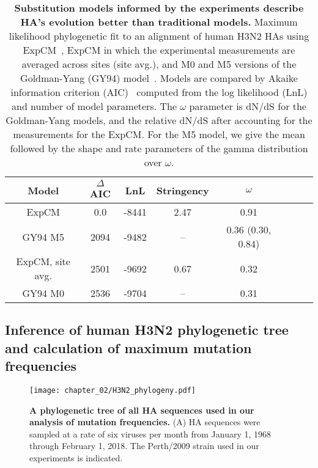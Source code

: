 \begin{table}
\caption{\label{tab:phydms}
  {\bf Substitution models informed by the experiments describe HA's evolution better than traditional models.}
  Maximum likelihood phylogenetic fit to an alignment of human H3N2 HAs using ExpCM~\citep{hilton2017phydms}, ExpCM in which the experimental measurements are averaged across sites (site avg.), and M0 and M5 versions of the Goldman-Yang (GY94) model~\citep{yang2000codon}.
  Models are compared by Akaike information criterion (AIC)~\citep{posada2004model} computed from the log likelihood (LnL) and number of model parameters.
  The $\omega$ parameter is dN/dS for the Goldman-Yang models, and the relative dN/dS after accounting for the measurements for the ExpCM.
  For the M5 model, we give the mean followed by the shape and rate parameters of the gamma distribution over $\omega$.
}
\begin{center}
\begin{tabular}{cccccccc}
\hline
\bf{Model} & \bf{$\Delta$AIC} & \bf{LnL} & \bf{Stringency} & \bf{$\omega$}  \\ \hline
ExpCM & 0.0 & -8441 & 2.47 & 0.91 \\
GY94 M5 & 2094 & -9482 & -- & 0.36 (0.30, 0.84) \\
ExpCM, site avg. & 2501 & -9692 & 0.67 & 0.32 \\
GY94 M0 & 2536 & -9704 & -- & 0.31 \\
\hline
\end{tabular}
 \end{center}
\end{table}

\subsection*{Inference of human H3N2 phylogenetic tree and calculation of maximum mutation frequencies}

\begin{figure}
\centerline{\texttt{[image: chapter\_02/H3N2\_phylogeny.pdf]}}
\caption{\label{suppfig:tree}
  {\bf A phylogenetic tree of all HA sequences used in our analysis of mutation frequencies.}
  (A) HA sequences were sampled at a rate of six viruses per month from January 1, 1968 through February 1, 2018.
  The Perth/2009 strain used in our experiments is indicated.
}
\end{figure}


